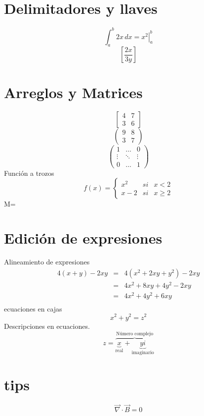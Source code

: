 \documentclass[11pt, letterpaper]{article}
\begin{document}
\section{Delimitadores y llaves}
\begin{equation*}
    \int_{a}^{b}2x\,dx=\left. x^2 \right|_{a}^b
\end{equation*}
\begin{equation*}
    \left [ \frac{2x}{3y} \right]
\end{equation*}
\section{Arreglos y Matrices}
\begin{equation*}
    \left[ 
    \begin{array}{cc}
        4&7\\
        3&6
    \end{array}
    \right]
\end{equation*}
\begin{equation*}
    \begin{pmatrix}
        9&8\\
        3&7
    \end{pmatrix}
\end{equation*}
\begin{equation*}
    \begin{pmatrix}
        1 & \ldots & 0 \\
        \vdots & \ddots & \vdots \\
        0 & \ldots & 1
    \end{pmatrix}
\end{equation*}
Función a trozos
\begin{equation*}
    f(x)=
    \left \{
    \begin{array}{lcc}
        x^2 &   si  & x < 2 \\
        x-2 &  si  & x \geq 2
    \end{array}
    \right.
\end{equation*}
M=
\section{Edición de expresiones}
Alineamiento de expresiones
\begin{eqnarray*}
    4(x+y)-2xy &=& 4(x^2+2xy+y^2)-2xy \\
             &=&  4x^2+8xy+4y^2-2xy \\
             &=&  4x^2+4y^2+6xy \\
\end{eqnarray*}
ecuaciones en cajas
\begin{equation*}
    \boxed{x^2+y^2=z^2}
\end{equation*}
Descripciones en ecuaciones.
\[
    z=\overbrace{
        \underbrace{x}_\text{real}+
        \underbrace{yi}_\text{imaginario}
    }^\text{Número complejo}
\]
\section{tips}
$$\vec{\nabla} \cdot \vec {B} = 0$$
\end{document}
